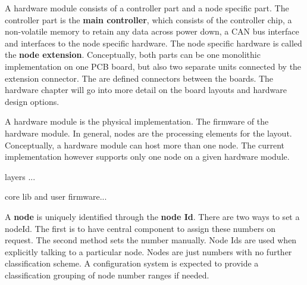\begin{center}
\end{center}
 

A hardware module consists of a controller part and a node specific part. The controller part is the {\bf main controller}, which consists of the controller chip, a non-volatile memory to retain any data across power down, a CAN bus interface and interfaces to the node specific hardware. The node specific hardware is called the {\bf node extension}. Conceptually, both parts can be one monolithic implementation on one PCB board, but also two separate units connected by the extension connector. The are defined connectors between the boards. The hardware chapter will go into more detail on the board layouts and hardware design options.


A hardware module is the physical implementation. The firmware of the hardware module. In general, nodes are the processing elements for the layout. Conceptually, a hardware module can host more than one node. The current implementation however supports only one node on a given hardware module.


\begin{center}
\end{center}

layers ...

core lib and user firmware...



A \textbf{node} is uniquely identified through the {\bf node Id}. There are two ways to set a nodeId. The first is to have central component to assign these numbers on request. The second method sets the number manually. Node Ids are used when explicitly talking to a particular node. Nodes are just numbers with no further classification scheme. A configuration system is expected to provide a classification grouping of node number ranges if needed.

